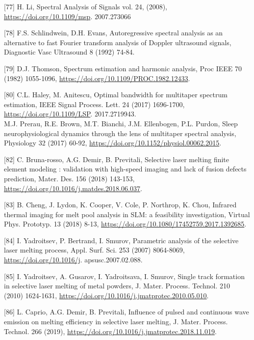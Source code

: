 \documentclass[10pt]{article}
\begin{document}
[77] H. Li, Spectral Analysis of Signals vol. 24, (2008), \href{https://doi.org/10.1109/msp}{https://doi.org/10.1109/msp}. 2007.273066

[78] F.S. Schlindwein, D.H. Evans, Autoregressive spectral analysis as an alternative to fast Fourier transform analysis of Doppler ultrasound signals, Diagnostic Vasc Ultrasound 8 (1992) 74-84.

[79] D.J. Thomson, Spectrum estimation and harmonic analysis, Proc IEEE 70 (1982) 1055-1096, \href{https://doi.org/10.1109/PROC.1982.12433}{https://doi.org/10.1109/PROC.1982.12433}.

[80] C.L. Haley, M. Anitescu, Optimal bandwidth for multitaper spectrum estimation, IEEE Signal Process. Lett. 24 (2017) 1696-1700, \href{https://doi.org/10.1109/LSP}{https://doi.org/10.1109/LSP}. 2017.2719943.\\
[81] M.J. Prerau, R.E. Brown, M.T. Bianchi, J.M. Ellenbogen, P.L. Purdon, Sleep neurophysiological dynamics through the lens of multitaper spectral analysis, Physiology 32 (2017) 60-92, \href{https://doi.org/10.1152/physiol.00062.2015}{https://doi.org/10.1152/physiol.00062.2015}.

[82] C. Bruna-rosso, A.G. Demir, B. Previtali, Selective laser melting finite element modeling : validation with high-speed imaging and lack of fusion defects prediction, Mater. Des. 156 (2018) 143-153, \href{https://doi.org/10.1016/j.matdes.2018.06.037}{https://doi.org/10.1016/j.matdes.2018.06.037}.

[83] B. Cheng, J. Lydon, K. Cooper, V. Cole, P. Northrop, K. Chou, Infrared thermal imaging for melt pool analysis in SLM: a feasibility investigation, Virtual Phys. Prototyp. 13 (2018) 8-13, \href{https://doi.org/10.1080/17452759.2017.1392685}{https://doi.org/10.1080/17452759.2017.1392685}.

[84] I. Yadroitsev, P. Bertrand, I. Smurov, Parametric analysis of the selective laser melting process, Appl. Surf. Sci. 253 (2007) 8064-8069, \href{https://doi.org/10.1016/j}{https://doi.org/10.1016/j}. apsusc.2007.02.088.

[85] I. Yadroitsev, A. Gusarov, I. Yadroitsava, I. Smurov, Single track formation in selective laser melting of metal powders, J. Mater. Process. Technol. 210 (2010) 1624-1631, \href{https://doi.org/10.1016/j.jmatprotec.2010.05.010}{https://doi.org/10.1016/j.jmatprotec.2010.05.010}.

[86] L. Caprio, A.G. Demir, B. Previtali, Influence of pulsed and continuous wave emission on melting efficiency in selective laser melting, J. Mater. Process. Technol. 266 (2019), \href{https://doi.org/10.1016/j.jmatprotec.2018.11.019}{https://doi.org/10.1016/j.jmatprotec.2018.11.019}.
\end{document}
